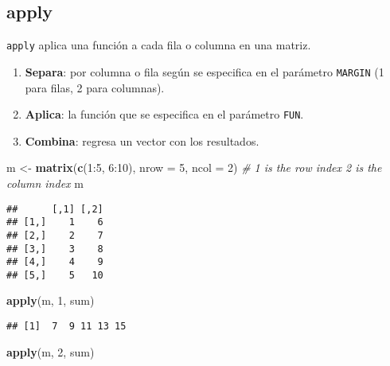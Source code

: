 \documentclass[]{article}
\newenvironment{Shaded}{\begin{snugshade}}{\end{snugshade}}
\newcommand{\KeywordTok}[1]{\textcolor[rgb]{0.13,0.29,0.53}{\textbf{{#1}}}}
\newcommand{\DataTypeTok}[1]{\textcolor[rgb]{0.13,0.29,0.53}{{#1}}}
\newcommand{\DecValTok}[1]{\textcolor[rgb]{0.00,0.00,0.81}{{#1}}}
\newcommand{\StringTok}[1]{\textcolor[rgb]{0.31,0.60,0.02}{{#1}}}
\newcommand{\CommentTok}[1]{\textcolor[rgb]{0.56,0.35,0.01}{\textit{{#1}}}}
\newcommand{\NormalTok}[1]{{#1}}
\begin{document}
\subsection{apply}\label{apply}

\texttt{apply} aplica una función a cada fila o columna en una matriz.

\begin{enumerate}
\def\labelenumi{\arabic{enumi}.}
\itemsep1pt\parskip0pt
\item
  \textbf{Separa}: por columna o fila según se especifica en el
  parámetro \texttt{MARGIN} (1 para filas, 2 para columnas).
\item
  \textbf{Aplica}: la función que se especifica en el parámetro
  \texttt{FUN}.
\item
  \textbf{Combina}: regresa un vector con los resultados.
\end{enumerate}

\begin{Shaded}
\begin{Highlighting}[]
\NormalTok{m <-}\StringTok{ }\KeywordTok{matrix}\NormalTok{(}\KeywordTok{c}\NormalTok{(}\DecValTok{1}\NormalTok{:}\DecValTok{5}\NormalTok{, }\DecValTok{6}\NormalTok{:}\DecValTok{10}\NormalTok{), }\DataTypeTok{nrow =} \DecValTok{5}\NormalTok{, }\DataTypeTok{ncol =} \DecValTok{2}\NormalTok{)}
\CommentTok{# 1 is the row index 2 is the column index}
\NormalTok{m}
\end{Highlighting}
\end{Shaded}

\begin{verbatim}
##      [,1] [,2]
## [1,]    1    6
## [2,]    2    7
## [3,]    3    8
## [4,]    4    9
## [5,]    5   10
\end{verbatim}

\begin{Shaded}
\begin{Highlighting}[]
\KeywordTok{apply}\NormalTok{(m, }\DecValTok{1}\NormalTok{, sum)}
\end{Highlighting}
\end{Shaded}

\begin{verbatim}
## [1]  7  9 11 13 15
\end{verbatim}

\begin{Shaded}
\begin{Highlighting}[]
\KeywordTok{apply}\NormalTok{(m, }\DecValTok{2}\NormalTok{, sum)}
\end{Highlighting}
\end{Shaded}
\end{document}
